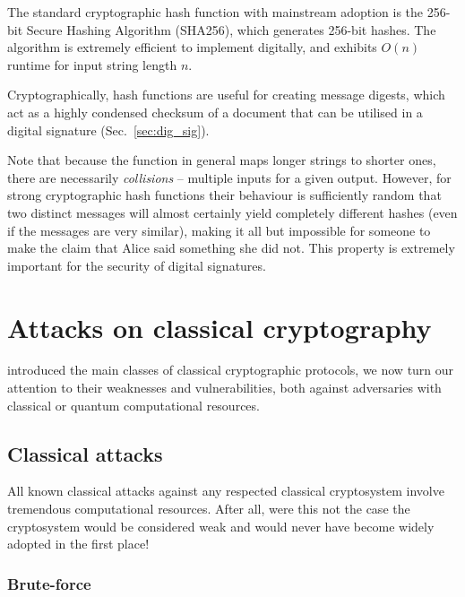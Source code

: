 The standard cryptographic hash function with mainstream adoption is the 256-bit Secure Hashing Algorithm (SHA256), which generates 256-bit hashes. The algorithm is extremely efficient to implement digitally, and exhibits $O(n)$ runtime for input string length $n$.

Cryptographically, hash functions are useful for creating message digests, which act as a highly condensed checksum of a document that can be utilised in a digital signature (Sec.~\ref{sec:dig_sig}).

Note that because the function in general maps longer strings to shorter ones, there are necessarily \textit{collisions} -- multiple inputs for a given output. However, for strong cryptographic hash functions their behaviour is sufficiently random that two distinct messages will almost certainly yield completely different hashes (even if the messages are very similar), making it all but impossible for someone to make the claim that Alice said something she did not. This property is extremely important for the security of digital signatures.

%
%

\section{Attacks on classical cryptography}\label{sec:attacks_on_class}

 introduced the main classes of classical cryptographic protocols, we now turn our attention to their weaknesses and vulnerabilities, both against adversaries with classical or quantum computational resources.

%
%

\subsection{Classical attacks}

All known classical attacks against any respected classical cryptosystem involve tremendous computational resources. After all, were this not the case the cryptosystem would be considered weak and would never have become widely adopted in the first place!

%
%

\subsubsection{Brute-force}\label{sec:brute_force_attack}

